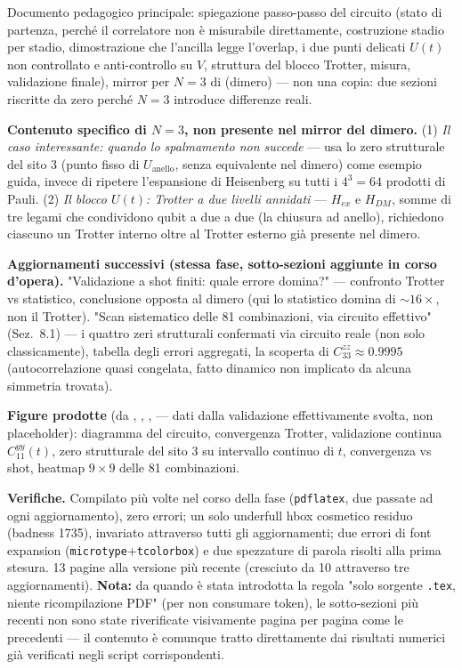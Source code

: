 \documentclass[11pt,a4paper]{article}
\begin{document}
Documento pedagogico principale: spiegazione passo-passo del circuito (stato di
partenza, perché il correlatore non è misurabile direttamente, costruzione stadio
per stadio, dimostrazione che l'ancilla legge l'overlap, i due punti delicati
$U(t)$ non controllato e anti-controllo su $V$, struttura del blocco Trotter,
misura, validazione finale), mirror per $N=3$ di
\texttt{} (dimero) — non una copia:
due sezioni riscritte da zero perché $N=3$ introduce differenze reali.

\textbf{Contenuto specifico di $N=3$, non presente nel mirror del dimero.}
(1) \emph{Il caso interessante: quando lo spalmamento non succede} — usa lo zero
strutturale del sito 3 (punto fisso di $U_\text{anello}$, senza equivalente nel
dimero) come esempio guida, invece di ripetere l'espansione di Heisenberg su tutti
i $4^3=64$ prodotti di Pauli. (2) \emph{Il blocco $U(t)$: Trotter a due livelli
annidati} — $H_{ex}$ e $H_{DM}$, somme di tre legami che condividono qubit a due a
due (la chiusura ad anello), richiedono ciascuno un Trotter interno oltre al
Trotter esterno già presente nel dimero.

\textbf{Aggiornamenti successivi (stessa fase, sotto-sezioni aggiunte in corso
d'opera).} "Validazione a shot finiti: quale errore domina?" — confronto Trotter
vs statistico, conclusione opposta al dimero (qui lo statistico domina di
$\sim16\times$, non il Trotter). "Scan sistematico delle 81 combinazioni, via
circuito effettivo" (Sez.~8.1) — i quattro zeri strutturali confermati via
circuito reale (non solo classicamente), tabella degli errori aggregati, la
scoperta di $C_{33}^{zz}\approx0.9995$ (autocorrelazione quasi congelata, fatto
dinamico non implicato da alcuna simmetria trovata).

\textbf{Figure prodotte} (da
\texttt{},
\texttt{},
\texttt{},
\texttt{} — dati dalla validazione
effettivamente svolta, non placeholder): diagramma del circuito, convergenza
Trotter, validazione continua $C_{11}^{yy}(t)$, zero strutturale del sito 3 su
intervallo continuo di $t$, convergenza vs shot, heatmap $9\times9$ delle 81
combinazioni.

\textbf{Verifiche.} Compilato più volte nel corso della fase (\texttt{pdflatex},
due passate ad ogni aggiornamento), zero errori; un solo underfull hbox cosmetico
residuo (badness 1735), invariato attraverso tutti gli aggiornamenti; due errori
di font expansion (\texttt{microtype}+\texttt{tcolorbox}) e due spezzature di
parola risolti alla prima stesura. 13 pagine alla versione più recente (cresciuto
da 10 attraverso tre aggiornamenti). \textbf{Nota:} da quando è stata introdotta la
regola "solo sorgente \texttt{.tex}, niente ricompilazione PDF" (per non consumare
token), le sotto-sezioni più recenti non sono state riverificate visivamente pagina
per pagina come le precedenti — il contenuto è comunque tratto direttamente dai
risultati numerici già verificati negli script corrispondenti.
\end{document}
